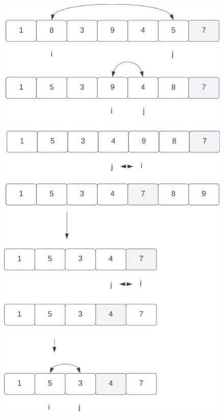 \begin{figure}
    \begin{center}
        \includegraphics[scale=0.3]{chapters/Sortierverfahren/img/quicksort1}
    \end{center}
    \begin{center}

\end{center}
\end{figure}
